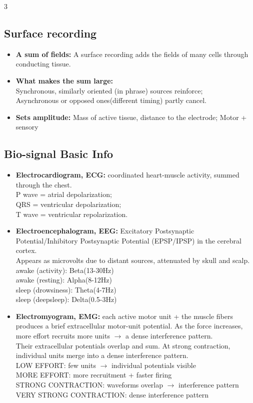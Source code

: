 \documentclass[10pt,a4paper]{ctexart}
\newcommand{\key}[1]{\textbf{#1}}
\begin{document}
\begin{multicols*}{3}
\subsection{Surface recording}
\begin{itemize}
    \item \key{A sum of fields:}  A surface recording adds the fields of many cells through conducting tissue.
    \item \key{What makes the sum large:}\\
    Synchronous, similarly oriented (in phrase) sources reinforce; \\
    Asynchronous or opposed ones(different timing) partly cancel.
    \item \key{Sets amplitude:} Mass of active tissue, distance to the electrode; Motor + sensory
\end{itemize}

\subsection{Bio-signal Basic Info}
\begin{itemize}
    \item \key{Electrocardiogram, ECG:}  coordinated heart-muscle activity, summed through the chest.\\
    P wave = atrial depolarization; \\
    QRS = ventricular depolarization;\\
    T wave = ventricular repolarization.
    \item \key{Electroencephalogram, EEG: }Excitatory Postsynaptic Potential/Inhibitory Postsynaptic Potential (EPSP/IPSP) in the cerebral cortex.\\
    Appears as microvolts due to distant sources, attenuated by skull and scalp.\\
    awake (activity): Beta(13-30Hz)\\
    awake (resting): Alpha(8-12Hz)\\
    sleep (drowsiness): Theta(4-7Hz)\\
    sleep (deepsleep): Delta(0.5-3Hz)\\
    \item \key{Electromyogram, EMG:} each active motor unit + the muscle fibers produces a brief extracellular motor-unit potential.
    As the force increases, more effort recruits more units $\rightarrow$ a dense interference pattern.\\
    Their extracellular potentials overlap and sum. At strong contraction, 
    individual units merge into a dense interference pattern.\\
    LOW EFFORT: few units $\rightarrow$ individual potentials visible\\
    MORE EFFORT: more recruitment + faster firing\\
    STRONG CONTRACTION: waveforms overlap $\rightarrow$ interference pattern\\
    VERY STRONG CONTRACTION: dense interference pattern
\end{itemize}


\end{multicols*}
\end{document}

